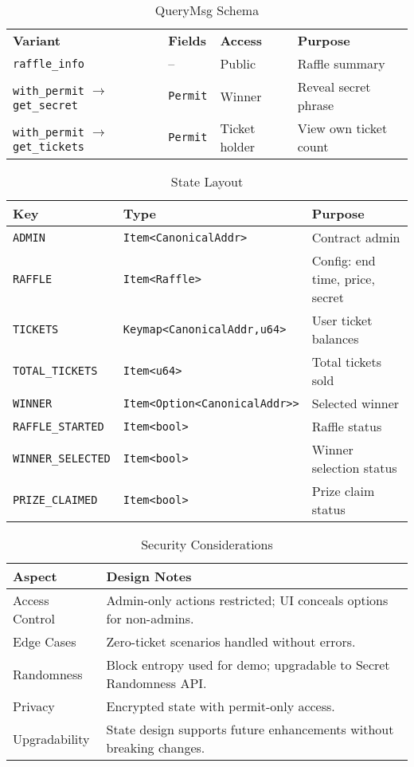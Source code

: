 \documentclass{article}
\begin{document}
\begin{table}[h]
  \centering
  \caption{QueryMsg Schema}
  \begin{tabular}{@{}llll@{}}
    \toprule
    \textbf{Variant} & \textbf{Fields} & \textbf{Access} & \textbf{Purpose} \\
    \texttt{raffle\_info} & -- & Public & Raffle summary \\
    \midrule
    \texttt{with\_permit} $\rightarrow$ \texttt{get\_secret} & \texttt{Permit} & Winner & Reveal secret phrase \\
    \midrule
    \texttt{with\_permit} $\rightarrow$ \texttt{get\_tickets} & \texttt{Permit} & Ticket holder & View own ticket count \\
    \bottomrule
  \end{tabular}
\end{table}

\begin{table}[h]
  \centering
  \caption{State Layout}
  \begin{tabular}{@{}lll@{}}
    \toprule
    \textbf{Key} & \textbf{Type} & \textbf{Purpose} \\
    \midrule
    \texttt{ADMIN} & \texttt{Item<CanonicalAddr>} & Contract admin \\
    \texttt{RAFFLE} & \texttt{Item<Raffle>} & Config: end time, price, secret \\
    \texttt{TICKETS} & \texttt{Keymap<CanonicalAddr,u64>} & User ticket balances \\
    \texttt{TOTAL\_TICKETS} & \texttt{Item<u64>} & Total tickets sold \\
    \texttt{WINNER} & \texttt{Item<Option<CanonicalAddr>>} & Selected winner \\
    \texttt{RAFFLE\_STARTED} & \texttt{Item<bool>} & Raffle status \\
    \texttt{WINNER\_SELECTED} & \texttt{Item<bool>} & Winner selection status \\
    \texttt{PRIZE\_CLAIMED} & \texttt{Item<bool>} & Prize claim status \\
    \bottomrule
\end{tabular}
\end{table}

\begin{table}[h]
  \centering
  \caption{Security Considerations}
  \begin{tabular}{@{}lp{10cm}@{}}
    \toprule
    \textbf{Aspect} & \textbf{Design Notes} \\
    \midrule
    Access Control & Admin-only actions restricted; UI conceals options for non-admins. \\
    Edge Cases & Zero-ticket scenarios handled without errors. \\
    Randomness & Block entropy used for demo; upgradable to Secret Randomness API. \\
    Privacy & Encrypted state with permit-only access. \\
    Upgradability & State design supports future enhancements without breaking changes. \\
    \bottomrule
  \end{tabular}
\end{table}
\end{document}
